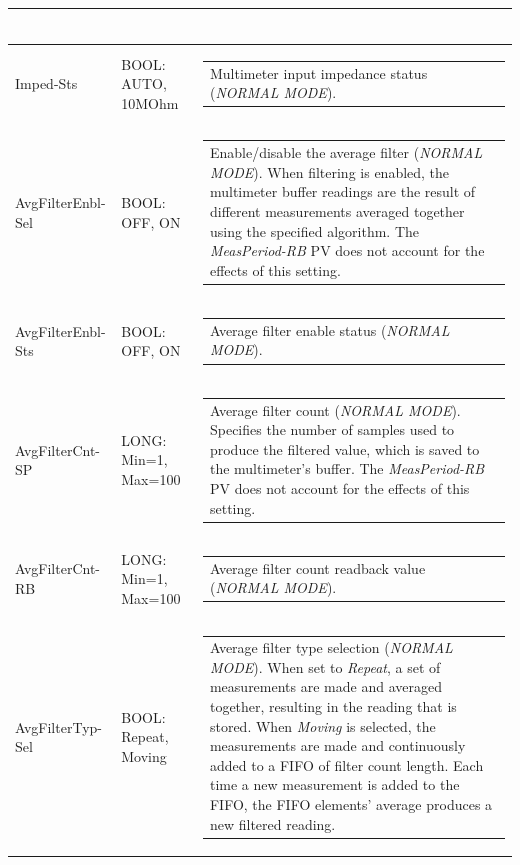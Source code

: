 \documentclass[openany]{article}
\begin{document}
\begin{longtable}{| m{3.0cm} m{4.5cm} m{7.0cm} |}
\begin{tabular}{@{}m{6cm}@{}}
						\end{tabular} \\ \hline
		Imped-Sts & BOOL: AUTO, 10MOhm & \begin{tabular}{@{}m{6cm}@{}}
	    					Multimeter input impedance status (\emph{NORMAL MODE}).
						\end{tabular} \\ \hline
		AvgFilterEnbl-Sel & BOOL: OFF, ON & \begin{tabular}{@{}m{6cm}@{}}
	    					Enable/disable the average filter (\emph{NORMAL MODE}). When filtering is enabled, the multimeter buffer readings are the result of different measurements averaged together using the specified algorithm. The \emph{MeasPeriod-RB} PV does not account for the effects of this setting.
						\end{tabular} \\ \hline
		AvgFilterEnbl-Sts & BOOL: OFF, ON & \begin{tabular}{@{}m{6cm}@{}}
	    					Average filter enable status (\emph{NORMAL MODE}).
						\end{tabular} \\ \hline
		AvgFilterCnt-SP & LONG: Min=1, Max=100 & \begin{tabular}{@{}m{6cm}@{}}
	    					Average filter count (\emph{NORMAL MODE}). Specifies the number of samples used to produce the filtered value, which is saved to the multimeter's buffer. The \emph{MeasPeriod-RB} PV does not account for the effects of this setting.
						\end{tabular} \\ \hline
		AvgFilterCnt-RB & LONG: Min=1, Max=100 & \begin{tabular}{@{}m{6cm}@{}}
	    					Average filter count readback value (\emph{NORMAL MODE}).
						\end{tabular} \\ \hline
		AvgFilterTyp-Sel & BOOL: Repeat, Moving & \begin{tabular}{@{}m{6cm}@{}}
	    					Average filter type selection (\emph{NORMAL MODE}). When set to \emph{Repeat}, a set of measurements are made and averaged together, resulting in the reading that is stored. When \emph{Moving} is selected, the measurements are made and continuously added to a FIFO of filter count length. Each time a new measurement is added to the FIFO, the FIFO elements' average produces a new filtered reading.
						\end{tabular} \\ \hline

\end{longtable}
\end{document}
